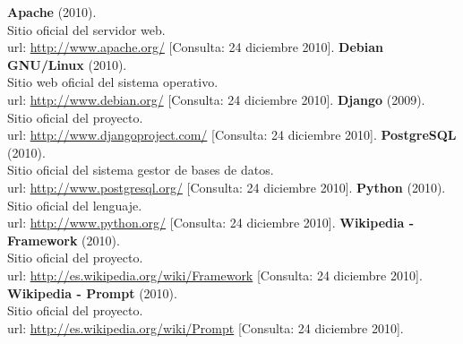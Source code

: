 \begin{thebibliography}{xx}

 \textbf{Apache} (2010).\\
        Sitio oficial del servidor web.\\
        url: \url{http://www.apache.org/}
        [Consulta: 24 diciembre 2010].
 \textbf{Debian GNU/Linux} (2010).\\
         Sitio web oficial del sistema operativo.\\
         url: \url{http://www.debian.org/}
         [Consulta: 24 diciembre 2010].
 \textbf{Django} (2009).\\
         Sitio oficial del proyecto.\\
         url: \url{http://www.djangoproject.com/}
         [Consulta: 24 diciembre 2010].
 \textbf{PostgreSQL} (2010).\\
         Sitio oficial del sistema gestor de bases de datos.\\
         url: \url{http://www.postgresql.org/}
         [Consulta: 24 diciembre 2010].
 \textbf{Python} (2010).\\
         Sitio oficial del lenguaje.\\
         url: \url{http://www.python.org/}
         [Consulta: 24 diciembre 2010].
 \textbf{Wikipedia - Framework} (2010).\\
         Sitio oficial del proyecto.\\
         url: \url{http://es.wikipedia.org/wiki/Framework}
         [Consulta: 24 diciembre 2010].
 \textbf{Wikipedia - Prompt} (2010).\\
         Sitio oficial del proyecto.\\
         url: \url{http://es.wikipedia.org/wiki/Prompt}
         [Consulta: 24 diciembre 2010].

 \end{thebibliography}